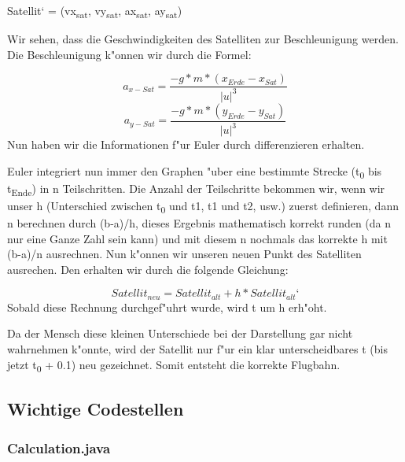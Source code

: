 \documentclass[11pt]{report}
\begin{document}
\centering Satellit‘ = (vx\textsubscript{sat}, vy\textsubscript{sat}, ax\textsubscript{sat}, ay\textsubscript{sat})

\flushleft Wir sehen, dass die Geschwindigkeiten des Satelliten zur Beschleunigung werden. Die Beschleunigung k"onnen wir durch die Formel:

\begin{equation}
a_{x-Sat} = \frac{-g * m * (x_{Erde} - x_{Sat})}{|u|^3}
\end{equation}
\begin{equation}
a_{y-Sat} = \frac{-g * m * (y_{Erde} - y_{Sat})}{|u|^3}
\end{equation}
Nun haben wir die Informationen f"ur Euler durch differenzieren erhalten.
\linebreak

Euler integriert nun immer den Graphen "uber eine bestimmte Strecke (t\textsubscript{0} bis t\textsubscript{Ende}) in n Teilschritten. Die Anzahl der Teilschritte bekommen wir, wenn wir unser h (Unterschied zwischen t\textsubscript{0} und t1, t1 und t2, usw.) zuerst definieren, dann n berechnen durch (b-a)/h, dieses Ergebnis mathematisch korrekt runden (da n nur eine Ganze Zahl sein kann) und mit diesem n nochmals das korrekte h mit (b-a)/n ausrechnen.
Nun k"onnen wir unseren neuen Punkt des Satelliten ausrechen.  Den erhalten wir durch die folgende Gleichung:

\begin{equation}
Satellit_{neu} = Satellit_{alt} + h * Satellit_{alt}‘
\end{equation}
Sobald diese Rechnung durchgef"uhrt wurde, wird t um h erh"oht.
\linebreak

Da der Mensch diese kleinen Unterschiede bei der Darstellung gar nicht wahrnehmen k"onnte, wird der Satellit nur f"ur ein klar unterscheidbares t (bis jetzt t\textsubscript{0} + 0.1) neu gezeichnet. Somit entsteht die korrekte Flugbahn.
\newpage
\subsection{Wichtige Codestellen}
\subsubsection{Calculation.java}
\end{document}
